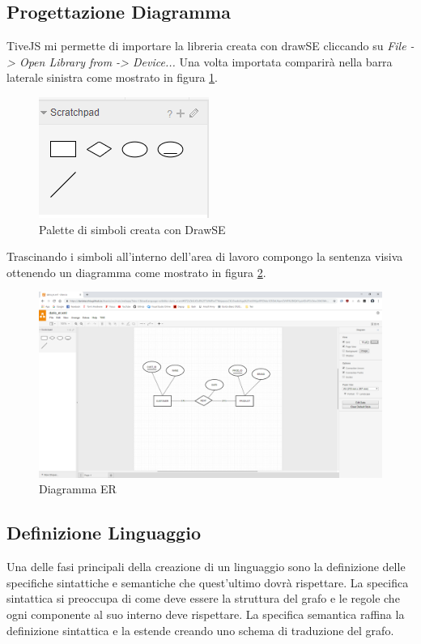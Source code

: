         \subsection{Progettazione Diagramma}
            TiveJS mi permette di importare la libreria creata con drawSE cliccando su \textit{File -> Open Library from -> Device...} Una volta importata comparirà nella barra laterale sinistra come mostrato in figura \ref{fig:library}.
            \begin{figure}[htbp]
                \centering
                \includegraphics[scale=0.6]{Figure/drawse/library.PNG}
                \caption{Palette di simboli creata con DrawSE}
                \label{fig:library}
            \end{figure}
            Trascinando i simboli all'interno dell'area di lavoro compongo la sentenza visiva ottenendo un diagramma come mostrato in figura \ref{fig:sentence}.
            \begin{figure}[htbp]
                \centering
                \includegraphics[scale=0.25]{Figure/drawse/sentence.PNG}
                \caption{Diagramma ER}
                \label{fig:sentence}
            \end{figure}

        \subsection{Definizione Linguaggio}
            Una delle fasi principali della creazione di un linguaggio sono la definizione delle specifiche sintattiche e semantiche che quest'ultimo dovrà rispettare.
            \newline
            La specifica sintattica si preoccupa di come deve essere la struttura del grafo e le regole che ogni componente al suo interno deve rispettare. La specifica semantica raffina la definizione sintattica e la estende creando uno schema di traduzione del grafo.

